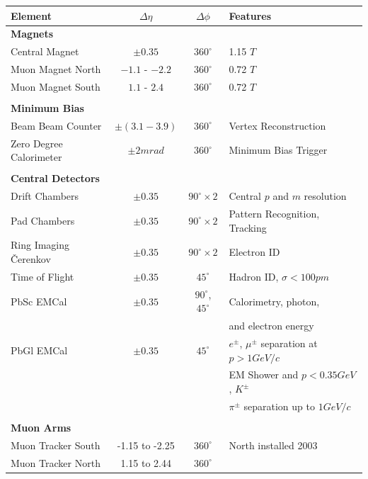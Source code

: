 \begin{table}
  \centering
  \begin{tabular}{l c c l}
    \toprule
    \textbf{Element}	& \textbf{$\Delta\eta$}	& \textbf{$\Delta\phi$} & \textbf{Features} \\
    \midrule
    \textbf{Magnets} & & & \\
    Central Magnet & $\pm 0.35$ & $360^{\circ}$ & 1.15 $T$ \\ 
    Muon Magnet North & $-1.1$ - $-2.2$ & $360^{\circ}$ & 0.72 $T$ \\
    Muon Magnet South & $1.1$ - $2.4$ & $360^{\circ}$ & 0.72 $T$ \\
                      & & & \\
    \textbf{Minimum Bias} & & & \\
    Beam Beam Counter & $\pm(3.1-3.9)$ & $360^{\circ}$ & Vertex Reconstruction \\
    Zero Degree Calorimeter & $\pm 2 mrad$ & $360^{\circ}$ & Minimum Bias Trigger \\
                            & & & \\
    \textbf{Central Detectors} & & & \\
    Drift Chambers & $\pm0.35$ & $90^{\circ}\times2$ & Central $p$ and $m$ resolution \\
    Pad Chambers & $\pm0.35$ & $90^{\circ}\times2$ & Pattern Recognition, Tracking \\
    Ring Imaging \v{C}erenkov & $\pm0.35$ & $90^{\circ}\times2$ & Electron ID \\
    Time of Flight & $\pm0.35$ & $45^{\circ}$ & Hadron ID, $\sigma<100pm$ \\
    PbSc EMCal & $\pm0.35$ & $90^{\circ}$, $45^{\circ}$ & Calorimetry, photon, \\
               & & & and electron energy \\
    PbGl EMCal & $\pm0.35$ & $45^{\circ}$ & $e^{\pm}$, $\mu^{\pm}$ separation at $p> 1 GeV/c$ \\
               & & & EM Shower and $p < 0.35 GeV$, $K^{\pm}$ \\
               & & & $\pi^{\pm}$ separation up to $1 GeV/c$  \\
               & & & \\
    \textbf{Muon Arms} & & & \\
    Muon Tracker South & -1.15 to -2.25 & $360^{\circ}$ & North installed 2003 \\
    Muon Tracker North & 1.15 to 2.44   & $360^{\circ}$ &  \\

\end{tabular}
\end{table}
